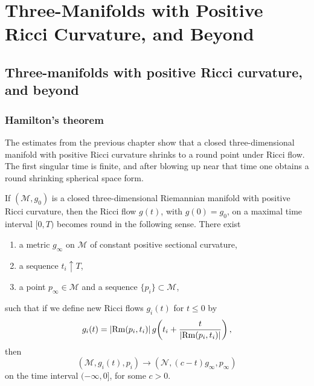 \chapter{Three-Manifolds with Positive Ricci Curvature, and Beyond}

\section{Three-manifolds with positive Ricci curvature, and beyond}

\subsection{Hamilton's theorem}

The estimates from the previous chapter show that a closed three-dimensional
manifold with positive Ricci curvature shrinks to a round point under Ricci
flow. The first singular time is finite, and after blowing up near that time one
obtains a round shrinking spherical space form.

\begin{theorem}
\label{topping-ch10-hamilton-theorem}
If \((\mathcal{M},g_0)\) is a closed three-dimensional Riemannian manifold
with positive Ricci curvature, then the Ricci flow \(g(t)\), with
\(g(0)=g_0\), on a maximal time interval \([0,T)\) becomes round in the
following sense. There exist
\begin{enumerate}
\item[(i)] a metric \(g_\infty\) on \(\mathcal{M}\) of constant positive sectional curvature,
\item[(ii)] a sequence \(t_i \uparrow T\),
\item[(iii)] a point \(p_\infty \in \mathcal{M}\) and a sequence \(\{p_i\} \subset \mathcal{M}\),
\end{enumerate}
such that if we define new Ricci flows \(g_i(t)\) for \(t \leq 0\) by
\[
g_i(t) = \lvert \operatorname{Rm}(p_i,t_i)\rvert\, g\!\left(t_i + \frac{t}{\lvert \operatorname{Rm}(p_i,t_i)\rvert}\right),
\]
then
\[
(\mathcal{M}, g_i(t), p_i) \to (\mathcal{N}, (c-t)g_\infty, p_\infty)
\]
on the time interval \((-\infty, 0]\), for some \(c > 0\).
\end{theorem}

